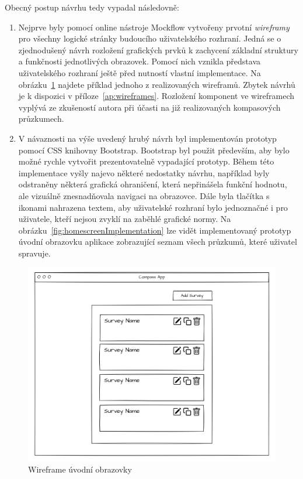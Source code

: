 Obecný postup návrhu tedy vypadal následovně:
\begin{enumerate}
    \item Nejprve byly pomocí online nástroje Mockflow vytvořeny prvotní \textit{wireframy} pro všechny
    logické stránky budoucího uživatelského rozhraní. Jedná se o zjednodušený návrh rozložení grafických
    prvků k zachycení základní struktury a funkčnosti jednotlivých obrazovek. Pomocí nich vznikla představa
    uživatelského rozhraní ještě před nutností vlastní implementace. Na obrázku~\ref{fig:wireframe1} najdete
    příklad jednoho z realizovaných wireframů. Zbytek návrhů je k dispozici v příloze~\ref{ap:wireframes}.
    Rozložení komponent ve wireframech vyplývá ze zkušeností autora při účasti na již realizovaných
    kompasových průzkumech.
    \item V návaznosti na výše uvedený hrubý návrh byl implementován prototyp pomocí CSS knihovny Bootstrap.
    Bootstrap byl použit především, aby bylo možné rychle vytvořit prezentovatelně vypadající prototyp.
    Během této implementace vyšly najevo některé nedostatky návrhu, například byly odstraněny některá grafická
    ohraničení, která nepřinášela funkční hodnotu, ale vizuálně znesnadňovala navigaci na obrazovce. Dále
    byla tlačítka s ikonami nahrazena textem, aby uživatelské rozhraní bylo jednoznačné i pro uživatele, kteří
    nejsou zvyklí na zaběhlé grafické normy. Na obrázku~\ref{fig:homescreenImplementation} lze vidět implementovaný prototyp 
    úvodní obrazovku aplikace zobrazující seznam všech průzkumů, které uživatel spravuje.
\end{enumerate}

\begin{figure}[h!]
    \centering
    \includegraphics[width=\textwidth]{images/wireframes/Survey_List.png}
    \caption{Wireframe úvodní obrazovky}
    \label{fig:wireframe1}
\end{figure}

